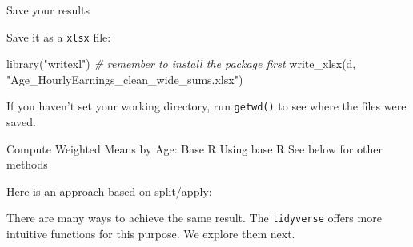 \documentclass[
  11pt,
  ignorenonframetext,
  svgnames, handout, t]{beamer}
\newenvironment{Shaded}{\begin{snugshade}}{\end{snugshade}}
\newcommand{\CommentTok}[1]{\textcolor[rgb]{0.56,0.35,0.01}{\textit{#1}}}
\newcommand{\ControlFlowTok}[1]{\textcolor[rgb]{0.13,0.29,0.53}{\textbf{#1}}}
\newcommand{\FunctionTok}[1]{\textcolor[rgb]{0.00,0.00,0.00}{#1}}
\newcommand{\NormalTok}[1]{#1}
\newcommand{\SpecialCharTok}[1]{\textcolor[rgb]{0.00,0.00,0.00}{#1}}
\newcommand{\StringTok}[1]{\textcolor[rgb]{0.31,0.60,0.02}{#1}}
\begin{document}
\begin{frame}[fragile]{Save your results}
\normalsize

Save it as a \texttt{xlsx} file:

\footnotesize

\begin{Shaded}
\begin{Highlighting}[]
\FunctionTok{library}\NormalTok{(}\StringTok{"writexl"}\NormalTok{)  }\CommentTok{\# remember to install the package first}
\FunctionTok{write\_xlsx}\NormalTok{(d, }\StringTok{"Age\_HourlyEarnings\_clean\_wide\_sums.xlsx"}\NormalTok{)}
\end{Highlighting}
\end{Shaded}

\normalsize

If you haven't set your working directory, run \texttt{getwd()} to see
where the files were saved.
\end{frame}

\begin{frame}[fragile]{Compute Weighted Means by Age: Base R}
\protect\hypertarget{compute-weighted-means-by-age-base-r}{}
Using base R \textbar{} See below for other methods

Here is an approach based on split/apply:

\footnotesize

\begin{Shaded}
\end{Shaded}

\normalsize

There are many ways to achieve the same result. The \texttt{tidyverse}
offers more intuitive functions for this purpose. We explore them next.
\end{frame}
\end{document}

